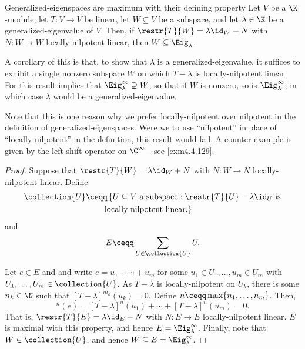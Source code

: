 \begin{prp}{Generalized-eigenspaces are maximum with their defining property}{}
	Let $V$ be a $\K$-module, let $T\colon V\rightarrow V$ be linear, let $W\subseteq V$ be a subspace, and let $\lambda \in \K$ be a generalized-eigenvalue of $V$.  Then, if $\restr{T}{W}=\lambda \id _W+N$ with $N\colon W\rightarrow W$ locally-nilpotent linear, then $W\subseteq \Eig _{\lambda}$.
	\begin{rmk}
		A corollary of this is that, to show that $\lambda$ is a generalized-eigenvalue, it suffices to exhibit a single nonzero subspace $W$ on which $T-\lambda$ is locally-nilpotent linear.  For this result implies that $\Eig _{\lambda}^{\infty}\supseteq W$, so that if $W$ is nonzero, so is $\Eig _{\lambda}^{\infty}$, in which case $\lambda$ would be a generalized-eigenvalue.
	\end{rmk}
	\begin{rmk}
		Note that this is one reason why we prefer locally-nilpotent over nilpotent in the definition of generalized-eigenspaces.  Were we to use ``nilpotent'' in place of ``locally-nilpotent'' in the definition, this result would fail.  A counter-example is given by the left-shift operator on $\C ^{\infty}$---see \cref{exm4.4.129}.
	\end{rmk}
	\begin{proof}
		Suppose that $\restr{T}{W}=\lambda \id _W+N$ with $N\colon W\rightarrow N$ locally-nilpotent linear.  Define
		\begin{equation}
			\begin{split}
				\collection{U} & \ceqq \left\{ U\subseteq V\text{ a subspace}:\restr{T}{U}-\lambda \id _U\text{ is}\right. \\ & \qquad \left. \text{locally-nilpotent linear.}\right\} 
			\end{split}
		\end{equation}
		and
		\begin{equation}
		E\ceqq \sum _{U\in \collection{U}}U.
		\end{equation}
		
		Let $e\in E$ and and write $e=u_1+\cdots +u_m$ for some $u_1\in U_1,\ldots ,u_m\in U_m$ with $U_1,\ldots ,U_m\in \collection{U}$.  As $T-\lambda$ is locally-nilpotent on $U_k$, there is some $n_k\in \N$ such that $[T-\lambda ]^{m_k}(u_k)=0$.  Define $n\ceqq \max \{ n_1,\ldots ,n_m\}$.  Then,
		\begin{equation}
			[T-\lambda ]^n(e)=[T-\lambda ]^n(u_1)+\cdots +[T-\lambda ]^n(u_m)=0.
		\end{equation}
		That is, $\restr{T}{E}=\lambda \id _E+N$ with $N\colon E\rightarrow E$ locally-nilpotent linear.  $E$ is maximal with this property, and hence $E=\Eig _{\lambda}^{\infty}$.  Finally, note that $W\in \collection{U}$, and hence $W\subseteq E=\Eig _{\lambda}^{\infty}$. 
	\end{proof}
\end{prp}
